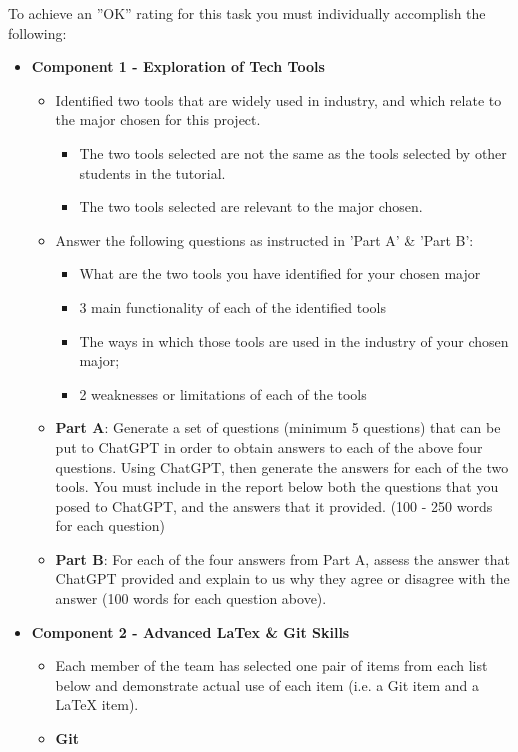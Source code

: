 \documentclass[a4paper, 11pt]{report}
\begin{document}
To achieve an ''OK'' rating for this task you must individually accomplish the following:
\begin{itemize}
\item \textbf{Component 1 - Exploration of Tech Tools}
	\begin{itemize}
	\item Identified two tools that are widely used in industry, and which relate to the major chosen for this project.
		\begin{itemize}
		\item The two tools selected are not the same as the tools selected by other students in the tutorial. 
		\item The two tools selected are relevant to the major chosen.
		\end{itemize}
	\item Answer the following questions as instructed in 'Part A' \& 'Part B':
		\begin{itemize}
		\item What are the two tools you have identified for your chosen major
		\item 3 main functionality of each of the identified tools
		\item The ways in which those tools are used in the industry of your chosen major;
		\item 2 weaknesses or limitations of each of the tools
		\end{itemize}
	\item \textbf{Part A}: Generate a set of questions (minimum 5 questions) that can be put to ChatGPT in order to obtain answers to each of the above four questions. Using ChatGPT, then generate the answers for each of the two tools. You must include in the report below both the questions that you posed to ChatGPT, and the answers that it provided. (100 - 250 words for each question)
	\item \textbf{Part B}: For each of the four answers from Part A, assess the answer that ChatGPT provided and explain to us why they agree or disagree with the answer (100 words for each question above).
	\end{itemize}
\item \textbf{Component 2 - Advanced LaTex \& Git Skills}
	\begin{itemize}
	\item Each member of the team has selected one pair of items from each list below and demonstrate actual use of each item (i.e. a Git item and a LaTeX item).
	\item \textbf{Git}

\end{itemize}
\end{itemize}
\end{document}
